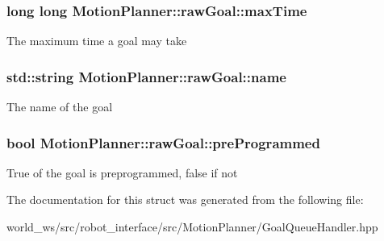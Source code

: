 \subsubsection[{\texorpdfstring{max\+Time}{maxTime}}]{\setlength{\rightskip}{0pt plus 5cm}long long Motion\+Planner\+::raw\+Goal\+::max\+Time}\hypertarget{structMotionPlanner_1_1rawGoal_afa955e47695e4a28c30c31dc64b5b8e5}{}\label{structMotionPlanner_1_1rawGoal_afa955e47695e4a28c30c31dc64b5b8e5}
The maximum time a goal may take 
\subsubsection[{\texorpdfstring{name}{name}}]{\setlength{\rightskip}{0pt plus 5cm}std\+::string Motion\+Planner\+::raw\+Goal\+::name}\hypertarget{structMotionPlanner_1_1rawGoal_af6298b64390d6d9d1c9047f7168d33fc}{}\label{structMotionPlanner_1_1rawGoal_af6298b64390d6d9d1c9047f7168d33fc}
The name of the goal 
\subsubsection[{\texorpdfstring{pre\+Programmed}{preProgrammed}}]{\setlength{\rightskip}{0pt plus 5cm}bool Motion\+Planner\+::raw\+Goal\+::pre\+Programmed}\hypertarget{structMotionPlanner_1_1rawGoal_ae2e017e05192a8bae95557f842cb731d}{}\label{structMotionPlanner_1_1rawGoal_ae2e017e05192a8bae95557f842cb731d}
True of the goal is preprogrammed, false if not 

The documentation for this struct was generated from the following file\+:\begin{DoxyCompactItemize}
\item 
world\+\_\+ws/src/robot\+\_\+interface/src/\+Motion\+Planner/Goal\+Queue\+Handler.\+hpp\end{DoxyCompactItemize}

